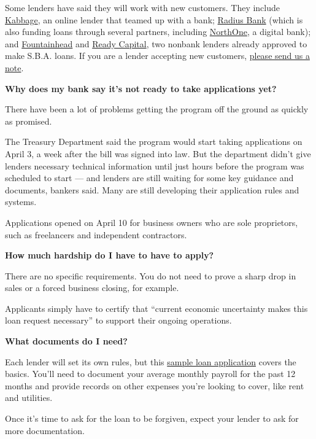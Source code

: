 Some lenders have said they will work with new customers. They include
\href{https://www.kabbage.com/}{Kabbage}, an online lender that teamed
up with a bank;
\href{https://radiusbank.com/business/sba-loans/paycheck-protection-program/}{Radius
Bank} (which is also funding loans through several partners, including
\href{https://www.northone.com/sba-loan-application}{NorthOne}, a
digital bank); and
\href{https://www.fountainheadcc.com/ppp/}{Fountainhead} and
\href{https://ppp.readycapital.com/}{Ready Capital}, two nonbank lenders
already approved to make S.B.A. loans. If you are a lender accepting new
customers, \href{mailto:stacy.cowley@nytimes.com}{please send us a
note}.

\textbf{Why does my bank say it's not ready to take applications yet?}

There have been a lot of problems getting the program off the ground as
quickly as promised.

The Treasury Department said the program would start taking applications
on April 3, a week after the bill was signed into law. But the
department didn't give lenders necessary technical information until
just hours before the program was scheduled to start --- and lenders are
still waiting for some key guidance and documents, bankers said. Many
are still developing their application rules and systems.

Applications opened on April 10 for business owners who are sole
proprietors, such as freelancers and independent contractors.

\textbf{How much hardship do I have to have to apply?}

There are no specific requirements. You do not need to prove a sharp
drop in sales or a forced business closing, for example.

Applicants simply have to certify that ``current economic uncertainty
makes this loan request necessary'' to support their ongoing operations.

\textbf{What documents do I need?}

Each lender will set its own rules, but this
\href{https://home.treasury.gov/system/files/136/Paycheck-Protection-Program-Application-3-30-2020-v3.pdf}{sample
loan application} covers the basics. You'll need to document your
average monthly payroll for the past 12 months and provide records on
other expenses you're looking to cover, like rent and utilities.

Once it's time to ask for the loan to be forgiven, expect your lender to
ask for more documentation.

